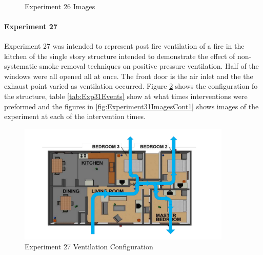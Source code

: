 \documentclass{article}
\begin{document}
\begin{figure}[H]
	\ContinuedFloat 
	\centering 
	 \ 
	\caption{Experiment 26 Images}
	\label{fig:Experiment30ImagesCont4} 
\end{figure}

\paragraph{Experiment 27} \mbox{}

Experiment 27 was intended to represent post fire ventilation of a fire in the kitchen of the single story structure intended to demonstrate the effect of non-systematic smoke removal techniques on positive pressure ventilation. Half of the windows were all opened all at once. The front door is the air inlet and the the exhaust point varied as ventilation occurred. Figure \ref{fig:Exp31VentConfig} shows the configuration fo the structure, table \ref{tab:Exp31Events} show at what times interventions were preformed and the figures in \ref{fig:Experiment31ImagesCont1} shows images of the experiment at each of the intervention times.

\begin{figure} [H]
	\centering
	\includegraphics[width = 4in]{0_Images/Tactical_Considerations/Systematic_Vs_Non-Systematic/Non_Systematic.pdf}
	\caption{Experiment 27 Ventilation Configuration}
	\label{fig:Exp31VentConfig}
\end{figure}
\end{document}
